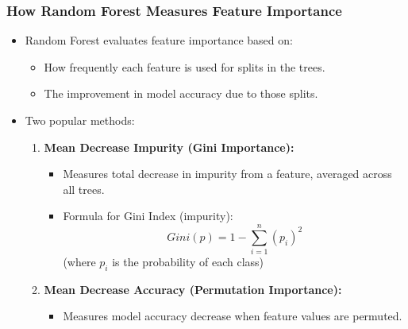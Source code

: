 \documentclass[aspectratio=169]{beamer}
\begin{document}
\begin{frame}[fragile]
    \frametitle{How Random Forest Measures Feature Importance}
    \begin{itemize}
        \item Random Forest evaluates feature importance based on:
            \begin{itemize}
                \item How frequently each feature is used for splits in the trees.
                \item The improvement in model accuracy due to those splits.
            \end{itemize}
        \item Two popular methods:
            \begin{enumerate}
                \item \textbf{Mean Decrease Impurity (Gini Importance):}
                \begin{itemize}
                    \item Measures total decrease in impurity from a feature, averaged across all trees.
                    \item Formula for Gini Index (impurity):
                    \begin{equation}
                        Gini(p) = 1 - \sum_{i=1}^{n} (p_i)^2
                    \end{equation}
                    (where \(p_i\) is the probability of each class)
                \end{itemize}
                \item \textbf{Mean Decrease Accuracy (Permutation Importance):}
                \begin{itemize}
                    \item Measures model accuracy decrease when feature values are permuted.
                \end{itemize}
            \end{enumerate}
    \end{itemize}
\end{frame}
\end{document}

